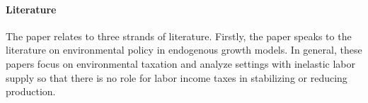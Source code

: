\paragraph{Literature}

 

The paper relates to three strands of literature. 
Firstly, the paper speaks to the literature on environmental policy in endogenous growth models.
In general, these papers focus on environmental taxation and analyze settings with inelastic labor supply so that there is no role for labor income taxes in stabilizing or reducing production.


